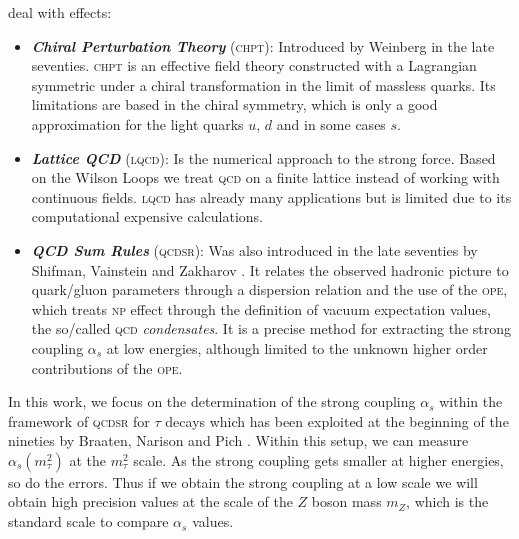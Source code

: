\documentclass[../../index.tex]{subfiles}
\begin{document}
deal with  effects:
\begin{itemize}
\item \textbf{\textit{Chiral Perturbation Theory}}
  (\textsc{chpt}):
  Introduced by Weinberg \cite{Weinberg1978} in the late seventies.
  \textsc{chpt} is an effective field theory constructed with a Lagrangian
  symmetric under a chiral transformation in the limit of massless quarks. Its
  limitations are based in the chiral symmetry, which is only a good
  approximation for the light quarks \(u\), \(d\) and in some cases \(s\).
\item \textbf{\textit{Lattice QCD}}
  (\textsc{lqcd}):
  Is the numerical approach to the strong force. Based on the Wilson Loops
  \cite{Wilson1974} we treat \textsc{qcd} on a finite lattice instead of working
  with continuous fields. \textsc{lqcd} has already many applications but is
  limited due to its computational expensive calculations.
\item \textbf{\textit{QCD Sum Rules}}
  (\textsc{qcdsr}): Was also introduced in the late seventies by Shifman, Vainstein and
  Zakharov \cite{Shifman1978,Shifman1978a}. It relates the observed hadronic
  picture to quark\-/gluon parameters through a dispersion relation and the use
  of the \textsc{ope}, which treats \textsc{np} effect through the definition of
  vacuum expectation values, the so\-/called \textsc{qcd} \textit{condensates}.
  It is a precise method for extracting the strong coupling \(\alpha_s\) at low
  energies, although limited to the unknown higher order contributions of the
  \textsc{ope}.
\end{itemize}


In this work, we focus on the determination of the strong coupling \(\alpha_s\)
within the framework of \textsc{qcdsr} for \(\tau\) decays which has been
exploited at the beginning of the nineties by Braaten, Narison and Pich
\cite{Braaten1991}. Within this setup, we can measure \(\alpha_s(m_\tau^2)\) at
the \(m_\tau^2\) scale. As the strong coupling gets smaller at higher energies,
so do the errors. Thus if we obtain the strong coupling at a low scale we will
obtain high precision values at the scale of the \(Z\) boson mass \(m_Z\), which
is the standard scale to compare \(\alpha_s\) values.
\end{document}
